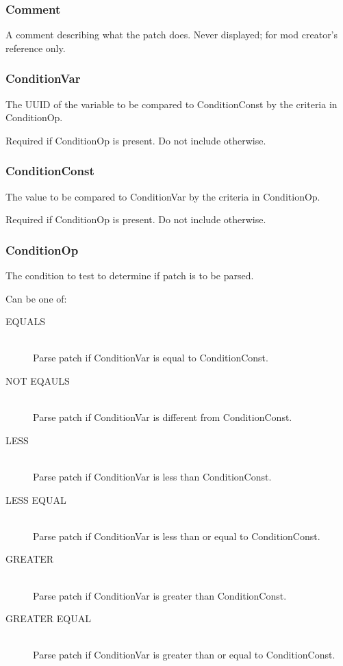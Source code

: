 \documentclass[12pt,a4paper,notitlepage]{article}
\begin{document}
\subsubsection{Comment}
A comment describing what the patch does. Never displayed; for mod creator's reference only.

\subsubsection{ConditionVar}
The UUID of the variable to be compared to ConditionConst by the criteria in ConditionOp.

Required if ConditionOp is present. Do not include otherwise.

\subsubsection{ConditionConst}
The value to be compared to ConditionVar by the criteria in ConditionOp.

Required if ConditionOp is present. Do not include otherwise.

\subsubsection{ConditionOp}
The condition to test to determine if patch is to be parsed.

Can be one of:

\begin{description}
\item[EQUALS] \hfill \\ 
	Parse patch if ConditionVar is equal to ConditionConst.
\item[NOT EQAULS] \hfill \\
	Parse patch if ConditionVar is different from ConditionConst.
\item[LESS] \hfill \\
	Parse patch if ConditionVar is less than ConditionConst.
\item[LESS EQUAL] \hfill \\
	Parse patch if ConditionVar is less than or equal to ConditionConst.
\item[GREATER] \hfill \\
	Parse patch if ConditionVar is greater than ConditionConst.
\item[GREATER EQUAL] \hfill \\
	Parse patch if ConditionVar is greater than or equal to ConditionConst.
\end{description}
\end{document}

